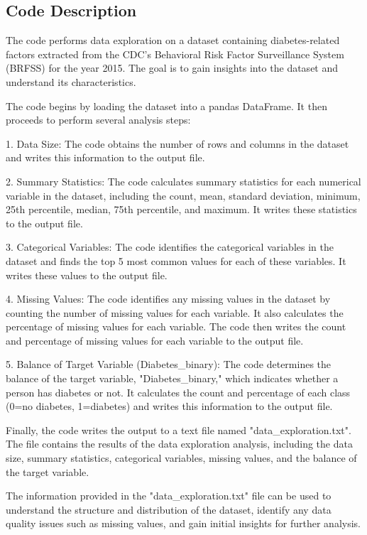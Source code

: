 \documentclass[11pt]{article}
\begin{document}
\subsection{Code Description}

The code performs data exploration on a dataset containing diabetes-related factors extracted from the CDC's Behavioral Risk Factor Surveillance System (BRFSS) for the year 2015. The goal is to gain insights into the dataset and understand its characteristics.

The code begins by loading the dataset into a pandas DataFrame. It then proceeds to perform several analysis steps:

1. Data Size:
   The code obtains the number of rows and columns in the dataset and writes this information to the output file.

2. Summary Statistics:
   The code calculates summary statistics for each numerical variable in the dataset, including the count, mean, standard deviation, minimum, 25th percentile, median, 75th percentile, and maximum. It writes these statistics to the output file.

3. Categorical Variables:
   The code identifies the categorical variables in the dataset and finds the top 5 most common values for each of these variables. It writes these values to the output file.

4. Missing Values:
   The code identifies any missing values in the dataset by counting the number of missing values for each variable. It also calculates the percentage of missing values for each variable. The code then writes the count and percentage of missing values for each variable to the output file.

5. Balance of Target Variable (Diabetes\_binary):
   The code determines the balance of the target variable, "Diabetes\_binary," which indicates whether a person has diabetes or not. It calculates the count and percentage of each class (0=no diabetes, 1=diabetes) and writes this information to the output file.

Finally, the code writes the output to a text file named "data\_exploration.txt". The file contains the results of the data exploration analysis, including the data size, summary statistics, categorical variables, missing values, and the balance of the target variable.

The information provided in the "data\_exploration.txt" file can be used to understand the structure and distribution of the dataset, identify any data quality issues such as missing values, and gain initial insights for further analysis.
\end{document}
